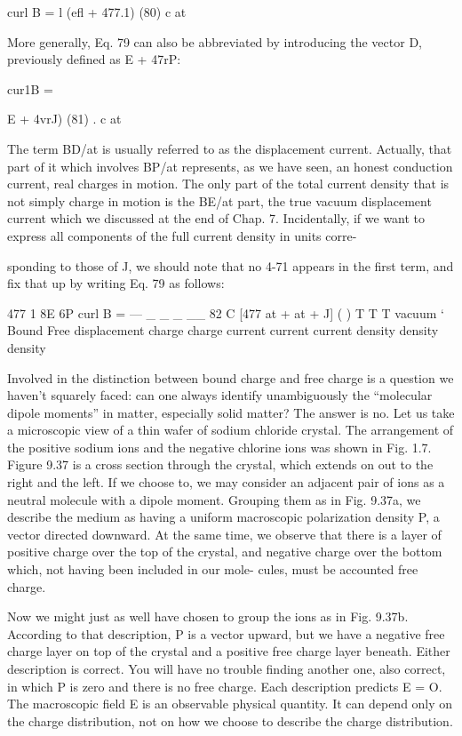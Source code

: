 \begin{equation}
\end{equation}
curl B = l (efl + 477.1) (80)
c at

More generally, Eq. 79 can also be abbreviated by introducing the
vector D, previously defined as E + 47rP:

\begin{equation}
\end{equation}
cur1B = {E + 4vrJ) (81)
. c at

The term BD/at is usually referred to as the displacement current.
Actually, that part of it which involves BP/at represents, as we have
seen, an honest conduction current, real charges in motion. The
only part of the total current density that is not simply charge in
motion is the BE/at part, the true vacuum displacement current
which we discussed at the end of Chap. 7. Incidentally, if we want
to express all components of the full current density in units corre-

sponding to those of J, we should note that no 4-71 appears in the first
term, and fix that up by writing Eq. 79 as follows:

\begin{equation}
\end{equation}
477 1 8E 6P
curl B =  --- _ _ _ __ 82
C [477 at + at + J] ( )
T T T
vacuum ‘ Bound Free
displacement charge charge
current current current
density density density

Involved in the distinction between bound charge and free charge
is a question we haven't squarely faced: can one always identify
unambiguously the ``molecular dipole moments'' in matter, especially
solid matter? The answer is no. Let us take a microscopic view of
a thin wafer of sodium chloride crystal. The arrangement of the
positive sodium ions and the negative chlorine ions was shown in
Fig. 1.7. Figure 9.37 is a cross section through the crystal, which
extends on out to the right and the left. If we choose to, we may
consider an adjacent pair of ions as a neutral molecule with a dipole
moment. Grouping them as in Fig. 9.37a, we describe the medium
as having a uniform macroscopic polarization density P, a vector
directed downward. At the same time, we observe that there is a
layer of positive charge over the top of the crystal, and negative
charge over the bottom which, not having been included in our mole-
cules, must be accounted free charge.

Now we might just as well have chosen to group the ions as in
Fig. 9.37b. According to that description, P is a vector upward, but
we have a negative free charge layer on top of the crystal and a positive
free charge layer beneath. Either description is correct. You will
have no trouble finding another one, also correct, in which P is zero
and there is no free charge. Each description predicts E = O. The
macroscopic field E is an observable physical quantity. It can depend
only on the charge distribution, not on how we choose to describe
the charge distribution.

}
